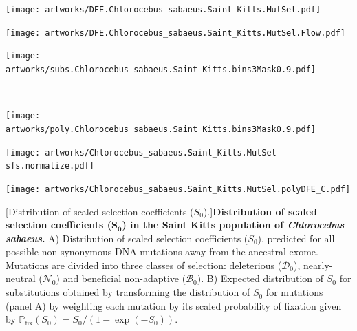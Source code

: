 \documentclass{article}
\newcommand{\proba}{\mathbb{P}}
\newcommand{\Sphy}{S_{0}}
\newcommand{\SphyDel}{\mathcal{D}_0}
\newcommand{\SphyNeu}{\mathcal{N}_0}
\newcommand{\SphyBen}{\mathcal{B}_0}
\begin{document}
    \newpage
    \begin{center}
        \begin{minipage}{0.32\linewidth}
            \texttt{[image: artworks/DFE.Chlorocebus\_sabaeus.Saint\_Kitts.MutSel.pdf]}
        \end{minipage}
        \begin{minipage}{0.32\linewidth}
            \texttt{[image: artworks/DFE.Chlorocebus\_sabaeus.Saint\_Kitts.MutSel.Flow.pdf]}
        \end{minipage}
        \begin{minipage}{0.32\linewidth}
            \texttt{[image: artworks/subs.Chlorocebus\_sabaeus.Saint\_Kitts.bins3Mask0.9.pdf]}
        \end{minipage}
        \\
        \begin{minipage}{0.32\linewidth}
            \texttt{[image: artworks/poly.Chlorocebus\_sabaeus.Saint\_Kitts.bins3Mask0.9.pdf]}
        \end{minipage}
        \begin{minipage}{0.32\linewidth}
            \texttt{[image: artworks/Chlorocebus\_sabaeus.Saint\_Kitts.MutSel-sfs.normalize.pdf]}
        \end{minipage}
        \begin{minipage}{0.32\linewidth}
            \texttt{[image: artworks/Chlorocebus\_sabaeus.Saint\_Kitts.MutSel.polyDFE\_C.pdf]}
        \end{minipage}
        [Distribution of scaled selection coefficients ($\Sphy$).]{\textbf{Distribution of scaled selection coefficients ($\bm{\Sphy}$) in the Saint Kitts population of \textit{Chlorocebus sabaeus}.}
        A) Distribution of scaled selection coefficients ($\Sphy$), predicted for all possible non-synonymous DNA mutations away from the ancestral exome.
        Mutations are divided into three classes of selection: deleterious ($\SphyDel$), nearly-neutral ($\SphyNeu$) and beneficial non-adaptive ($\SphyBen$).
        B) Expected distribution of $\Sphy$ for substitutions obtained by transforming the distribution of $\Sphy$ for mutations (panel A) by weighting each mutation by its scaled probability of fixation given by $\proba_{\text{fix}} (\Sphy) = \Sphy/(1-\exp(-\Sphy))$.
}
\end{center}
\end{document}
